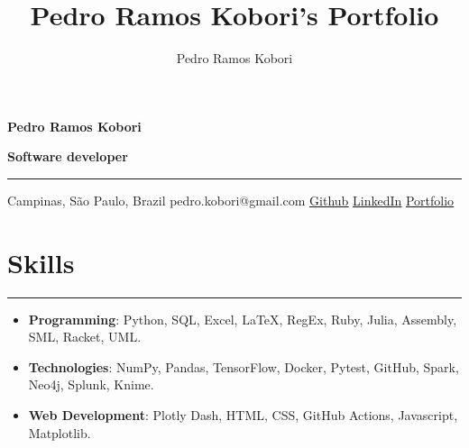 \documentclass[a4paper,10pt]{article}
\title{Pedro Ramos Kobori's Portfolio}
\newcommand{\ulink}[2]{\href{#1}{\underline{#2}}}
\begin{document}
\date{}
\author{Pedro Ramos Kobori}

\noindent
\begin{minipage}[t]{0.5\textwidth}
  \begin{flushleft}
    \textbf{\Large Pedro Ramos Kobori}
  \end{flushleft}
\end{minipage}
\begin{minipage}[t]{0.5\textwidth}
  \begin{flushright}
    \textbf{\Large Software developer}
  \end{flushright}
\end{minipage}

\hrule

\vspace{2mm}
\noindent
{
  \centering
  Campinas, São Paulo, Brazil \textbar{}
  pedro.kobori@gmail.com \textbar{}
  \ulink{https://github.com/rokobo}{Github} \textbar{}
  \ulink{https://www.linkedin.com/in/pedrokobori/}{LinkedIn} \textbar{}
  \ulink{https://rokobo.github.io}{Portfolio}
  \par
}

\section*{Skills}
\hrule
\vspace{2mm}
\begin{itemize}[itemsep=0pt]
  \item \textbf{Programming}: Python, SQL, Excel, LaTeX, RegEx, Ruby, Julia, Assembly, SML, Racket, UML.
  \item \textbf{Technologies}: NumPy, Pandas, TensorFlow, Docker, Pytest, GitHub, Spark, Neo4j, Splunk, Knime.
  \item \textbf{Web Development}: Plotly Dash, HTML, CSS, GitHub Actions, Javascript, Matplotlib.
\end{itemize}
\end{document}
